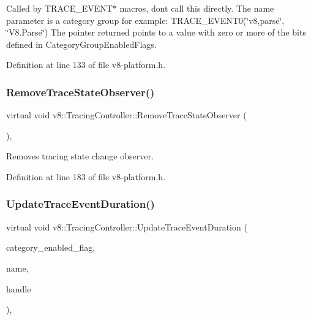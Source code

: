 Called by T\+R\+A\+C\+E\+\_\+\+E\+V\+E\+N\+T$\ast$ macros, don\textquotesingle{}t call this directly. The name parameter is a category group for example\+: T\+R\+A\+C\+E\+\_\+\+E\+V\+E\+N\+T0(\char`\"{}v8,parse\char`\"{}, \char`\"{}\+V8.\+Parse\char`\"{}) The pointer returned points to a value with zero or more of the bits defined in Category\+Group\+Enabled\+Flags. 

Definition at line 133 of file v8-\/platform.\+h.

\mbox{\label{classv8_1_1TracingController_ab8d5b3ac795188effb423fa2c0514353}} 
\subsubsection{\texorpdfstring{Remove\+Trace\+State\+Observer()}{RemoveTraceStateObserver()}}
{\footnotesize\ttfamily virtual void v8\+::\+Tracing\+Controller\+::\+Remove\+Trace\+State\+Observer (\begin{DoxyParamCaption}\item[{\mbox{\hyperlink{classv8_1_1TracingController_1_1TraceStateObserver}{Trace\+State\+Observer}} $\ast$}]{ }\end{DoxyParamCaption})\hspace{0.3cm}{\ttfamily [inline]}, {\ttfamily [virtual]}}

Removes tracing state change observer. 

Definition at line 183 of file v8-\/platform.\+h.

\mbox{\label{classv8_1_1TracingController_ac1fda6cdae5f6515b896b3df05d5a97e}} 
\subsubsection{\texorpdfstring{Update\+Trace\+Event\+Duration()}{UpdateTraceEventDuration()}}
{\footnotesize\ttfamily virtual void v8\+::\+Tracing\+Controller\+::\+Update\+Trace\+Event\+Duration (\begin{DoxyParamCaption}\item[{const uint8\+\_\+t $\ast$}]{category\+\_\+enabled\+\_\+flag,  }\item[{const \mbox{\hyperlink{classchar}{char}} $\ast$}]{name,  }\item[{uint64\+\_\+t}]{handle }\end{DoxyParamCaption})\hspace{0.3cm}{\ttfamily [inline]}, {\ttfamily [virtual]}}

